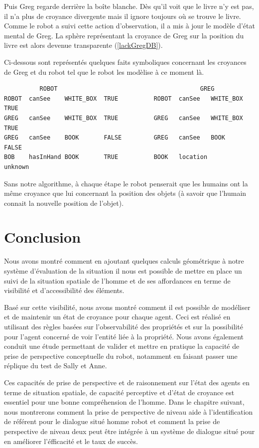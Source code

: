 \documentclass[a4paper,11pt,twoside]{StyleThese}
\begin{document}
Puis Greg regarde derrière la boîte blanche. Dès qu'il voit que le livre n'y est pas, il n'a plus de croyance divergente mais il ignore toujours où se trouve le livre. Comme le robot a suivi cette action d'observation, il a mis à jour le modèle d'état mental de Greg. La sphère représentant la croyance de Greg sur la position du livre est alors devenue transparente (\ref{lackGregDB}).

Ci-dessous sont représentés quelques faits symboliques concernant les croyances de Greg et du robot tel que le robot les modèlise à ce moment là.

\begin{scriptsize}
\begin{verbatim}
          ROBOT                                        GREG
ROBOT  canSee    WHITE_BOX  TRUE          ROBOT  canSee   WHITE_BOX   TRUE    
GREG   canSee    WHITE_BOX  TRUE          GREG   canSee   WHITE_BOX   TRUE
GREG   canSee    BOOK       FALSE         GREG   canSee   BOOK        FALSE
BOB    hasInHand BOOK       TRUE          BOOK   location             unknown
\end{verbatim}
\end{scriptsize}


Sans notre algorithme, à chaque étape le robot penserait que les humains ont la même croyance que lui concernant la position des objets (à savoir que l'humain connait la nouvelle position de l'objet).


\section{Conclusion}
Nous avons montré comment en ajoutant quelques calculs géométrique à notre système d'évaluation de la situation il nous est possible de mettre en place un suivi de la situation spatiale de l'homme et de ses affordances en terme de visibilité et d'accessibilité des éléments.

Basé sur cette visibilité, nous avons montré comment il est possible de modéliser et de maintenir un état de croyance pour chaque agent. Ceci est réalisé en utilisant des règles basées sur l'observabilité des propriétés et sur la possibilité pour l'agent concerné de voir l'entité liée à la propriété.
Nous avons également conduit une étude permettant de valider et mettre en pratique la capacité de prise de perspective conceptuelle du robot, notamment en faisant passer une réplique du test de Sally et Anne.

Ces capacités de prise de perspective et de raisonnement sur l'état des agents en terme de situation spatiale, de capacité perceptive et d'état de croyance est essentiel pour une bonne compréhension de l'homme.
Dans le chapitre suivant, nous montrerons comment la prise de perspective de niveau aide à l'identification de référent pour le dialogue situé homme robot et comment la prise de perspective de niveau deux peut être intégrée à un système de dialogue situé pour en améliorer l'éfficacité et le taux de succès.
\end{document}
